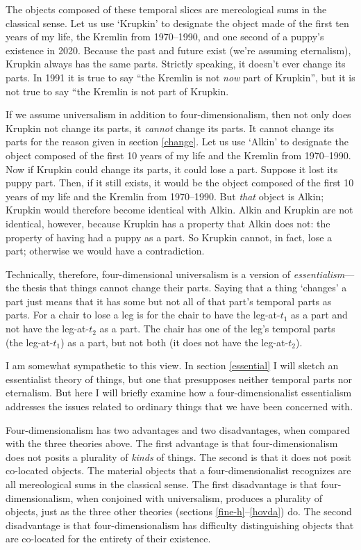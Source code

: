 \documentclass[11pt]{article}
\begin{document}
\begin{spacing}{1.5}
The objects composed of these temporal slices are mereological sums in
the classical sense.  Let us use `Krupkin' to designate the object
made of the first ten years of my life, the Kremlin from 1970--1990,
and one second of a puppy's existence in 2020.  Because the past and
future exist (we're assuming eternalism), Krupkin always has the same
parts.  Strictly speaking, it doesn't ever change its parts.  In 1991
it is true to say ``the Kremlin is not {\em now} part of Krupkin'',
but it is not true to say ``the Kremlin is not part of Krupkin.

If we assume universalism in addition to four-dimensionalism, then not
only does Krupkin not change its parts, it {\em cannot} change its
parts.  It cannot change its parts for the reason given in section
\ref{change}.  Let us use `Alkin' to designate the object composed of
the first 10 years of my life and the Kremlin from 1970--1990.  Now if
Krupkin could change its parts, it could lose a part.  Suppose it lost
its puppy part.  Then, if it still exists, it would be the object
composed of the first 10 years of my life and the Kremlin from
1970--1990.  But {\em that} object is Alkin; Krupkin would therefore
become identical with Alkin.  Alkin and Krupkin are not identical,
however, because Krupkin has a property that Alkin does not: the
property of having had a puppy as a part.  So Krupkin cannot, in fact,
lose a part; otherwise we would have a contradiction.

Technically, therefore, four-dimensional universalism is a version of
{\em essentialism}---the thesis that things cannot change their parts.
Saying that a thing `changes' a part just means that it has some but
not all of that part's temporal parts as parts.  For a chair to lose a
leg is for the chair to have the leg-at-$t_1$ as a part and not have
the leg-at-$t_2$ as a part.  The chair has one of the leg's temporal
parts (the leg-at-$t_1$) as a part, but not both (it does not have the
leg-at-$t_2$).

I am somewhat sympathetic to this view.  In section \ref{essential} I
will sketch an essentialist theory of things, but one that presupposes
neither temporal parts nor eternalism.  But here I will briefly
examine how a four-dimensionalist essentialism addresses the issues
related to ordinary things that we have been concerned with.

Four-dimensionalism has two advantages and two disadvantages, when
compared with the three theories above.  The first advantage is that
four-dimensionalism does not posits a plurality of {\em kinds} of
things.  The second is that it does not posit co-located objects.  The
material objects that a four-dimensionalist recognizes are all
mereological sums in the classical sense.  The first disadvantage is
that four-dimensionalism, when conjoined with universalism, produces a
plurality of objects, just as the three other theories (sections
\ref{fine-h}--\ref{hovda}) do.  The second disadvantage is that
four-dimensionalism has difficulty distinguishing objects that are
co-located for the entirety of their existence.


\end{spacing}
\end{document}
